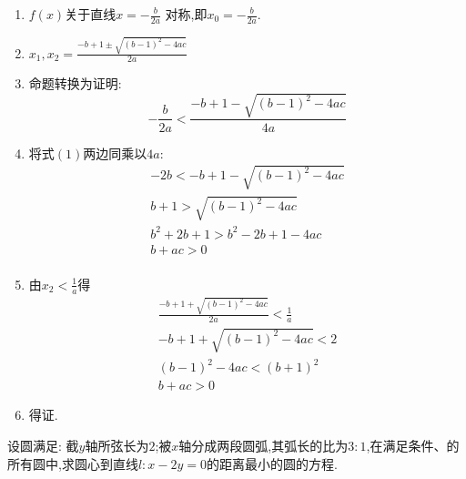 \documentclass[answers]{exam}
\begin{document}
\begin{questions}
\begin{solution}
\begin{penum}
			\item
			\begin{enumerate}[label=\protect\circled{\arabic*}]
				\item $f(x)$关于直线$x=-\frac{b}{2a}$ 对称,即$x_0 = -\frac{b}{2a}$.
				\item $x_1, x_2=\frac{-b + 1 \pm \sqrt{(b-1)^2-4ac}}{2a}$
				\item 命题转换为证明:
				      \begin{equation*}
					      -\frac{b}{2a} < \frac{-b + 1 - \sqrt{(b-1)^2 - 4ac}}{4a} \tag{1}
				      \end{equation*}
				\item 将式$(1)$两边同乘以$4a$:
				      \begin{align*}
					      -2b < -b + 1 - \sqrt{(b-1)^2 - 4ac} \\
					      b + 1 > \sqrt{(b-1)^2 - 4ac}        \\
					      b^2 + 2b + 1 > b^2 - 2b + 1 - 4ac   \\
					      b + ac > 0                          \\
				      \end{align*}
				\item 由$x_2 < \frac1a$得
				      \begin{align*}
					      \frac{-b + 1 + \sqrt{(b-1)^2 - 4ac}}{2a} < \frac1a \\
					      -b + 1 + \sqrt{(b-1)^2 - 4ac} < 2                  \\
					      (b-1)^2 - 4ac < (b+1)^2                            \\
					      b + ac > 0
				      \end{align*}
				\item 得证.
			\end{enumerate}
		\end{penum}
	\end{solution}

	\question 设圆满足:
	截$y$轴所弦长为$2$;被$x$轴分成两段圆弧,其弧长的比为$3:1$,在满足条件、的所有圆中,求圆心到直线$l:x-2y=0$的距离最小的圆的方程.


\end{questions}
\end{document}

